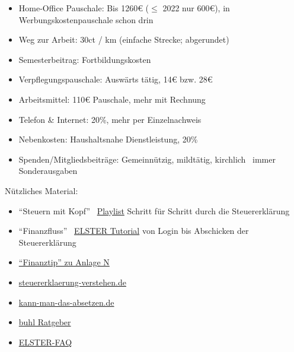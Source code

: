 \documentclass{beamer}
\begin{document}
			\begin{frame}
				\begin{itemize}
					\item Home-Office Pauschale: Bis 1260€ ($\leq$ 2022 nur 600€), in Werbungskostenpauschale schon drin
					\item Weg zur Arbeit: 30ct / km (einfache Strecke; abgerundet)
					\item Semesterbeitrag: Fortbildungskosten
					\item Verpflegungspauschale: Auswärts tätig, 14€ bzw. 28€
					\item Arbeitsmittel: 110€ Pauschale, mehr mit Rechnung
					\item Telefon \& Internet: 20\%, mehr per Einzelnachweis
					\item Nebenkosten: Haushaltsnahe Dienstleistung, 20\%
					\item Spenden/Mitgliedsbeiträge: Gemeinnützig, mildtätig, kirchlich \textrightarrow\ immer Sonderausgaben
				\end{itemize}
			\end{frame}
		
			\begin{frame}
				Nützliches Material:\n
				\begin{itemize}
					\item "`Steuern mit Kopf"' \textrightarrow\ \href{https://www.youtube.com/watch?v=vEYL7AlCTgw&list=PL0OXhlRkvak8sq4efIvHYxx4e_DrE8zZT}{Playlist} Schritt für Schritt durch die Steuererklärung
					\item "`Finanzfluss"' \textrightarrow\ \href{https://www.youtube.com/watch?v=FiAGN-RrHMg}{ELSTER Tutorial} von Login bis Abschicken der Steuererklärung
					\item \href{https://www.finanztip.de/steuererklaerung/steuererklaerung-anlage-n/}{"`Finanztip"' zu Anlage N}
					\item \href{https://www.steuererklaerung-verstehen.de/}{steuererklaerung-verstehen.de}
					\item \href{https://www.kann-man-das-absetzen.de/}{kann-man-das-absetzen.de}
					\item \href{https://www.buhl.de/steuer/ratgeber/}{buhl Ratgeber}
					\item \href{https://www.elster.de/eportal/helpGlobal?themaGlobal=help_est_ufa_10_2023}{ELSTER-FAQ}
				\end{itemize}
			\end{frame}
	
\end{document}
